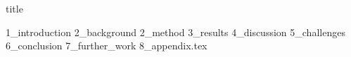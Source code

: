 \documentclass{article}
\begin{document}
{title}

\frontmatter

\tableofcontents


\mainmatter


{1_introduction}
{2_background}
{2_method}
{3_results}
{4_discussion}
{5_challenges}
{6_conclusion}
{7_further_work}
{8_appendix.tex}
\newpage



\end{document}
